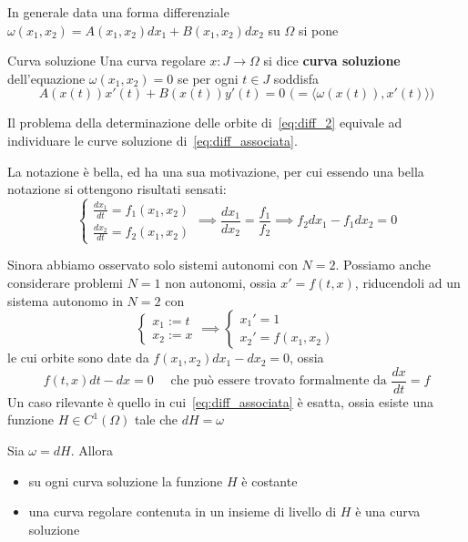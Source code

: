 In generale data una forma differenziale \(\omega{(x_{1},x_{2})} = A{(x_{1},
x_{2})}dx_{1} + B{(x_{1}, x_{2})}dx_{2}\) su \(\Omega\) si pone
\begin{definition}{Curva soluzione}
    Una curva regolare \(x:J\to \Omega\) si dice \textbf{curva soluzione}
    dell'equazione \(\omega{(x_{1}, x_{2})} = 0\) se per ogni \(t \in J\)
    soddisfa
    \[
        A{(x{(t)})}x'{(t)} + B{(x{(t)})}y'{(t)} = 0 \,\,\big(= \langle \omega{(x{(t)})},
        x'{(t)}\rangle\big)
    \]
\end{definition}
Il problema della determinazione delle orbite di~\eqref{eq:diff_2} equivale ad
individuare le curve soluzione di~\eqref{eq:diff_associata}.
\begin{remark}[Formalmente]
    La notazione è bella, ed ha una sua motivazione, per cui essendo una bella
    notazione si ottengono risultati sensati:
    \[
      \begin{cases}
          \frac{dx_{1}}{dt} = f_{1}{(x_{1}, x_{2})} \\
          \frac{dx_{2}}{dt} = f_{2}{(x_{1}, x_{2})}
      \end{cases}
      \implies \frac{dx_{1}}{dx_{2}} = \frac{f_{1}}{f_{2}} \implies f_{2}dx_{1} -
      f_{1}dx_{2} = 0
    \]
\end{remark}
Sinora abbiamo osservato solo sistemi autonomi con \(N = 2\). Possiamo anche
considerare problemi \(N=1\) non autonomi, ossia \(x' = f{(t, x)}\), riducendoli
ad un sistema autonomo in \(N = 2\) con
\[
  \begin{cases}
      x_{1} := t \\
      x_{2} := x
  \end{cases}
    \implies  
\begin{cases}
    x_{1}' = 1 \\
    x_{2}' = f{(x_{1}, x_{2})}
\end{cases}
\]
le cui orbite sono date da \(f{(x_{1}, x_{2})}dx_{1} - dx_{2} = 0\), ossia
\[
  f{(t, x)}dt - dx = 0 \quad \text{ che può essere trovato formalmente da }
  {\frac{dx}{dt} = f}
\]
Un caso rilevante è quello in cui~\eqref{eq:diff_associata} è esatta, ossia
esiste una funzione \(H \in C^{1}{(\Omega)}\) tale che \(dH = \omega\) 
\begin{proposition}
    Sia \(\omega = dH\). Allora
\begin{itemize}[label = --]
    \item su ogni curva soluzione la funzione \(H\) è costante
    \item una curva regolare contenuta in un insieme di livello di \(H\) è una
        curva soluzione
\end{itemize}
\end{proposition}
